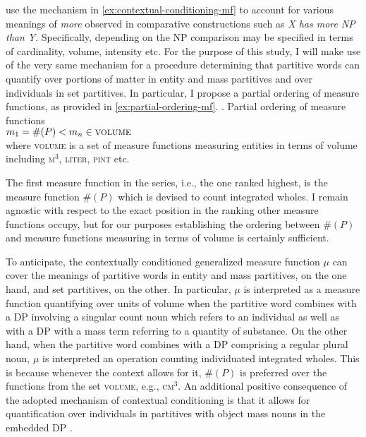 	\citeauthor{bale_barner2009interpretation} use the mechanism in \ref{ex:contextual-conditioning-mf} to account for various meanings of \textit{more} observed in comparative constructions such as \textit{X has more NP than Y}. Specifically, depending on the NP comparison may be specified in terms of cardinality, volume, intensity etc. For the purpose of this study, I will make use of the very same mechanism for a procedure determining that partitive words can quantify over portions of matter in entity and mass partitives and over individuals in set partitives. In particular, I propose a partial ordering of measure functions, as provided in \ref{ex:partial-ordering-mf}. 
	\ex. Partial ordering of measure functions\\
	$m_1 = \#(P) < m_n \in \textsc{volume}$\\
	where \textsc{volume} is a set of measure functions measuring entities in terms of volume including \textsc{m$^3$}, \textsc{liter}, \textsc{pint} etc.\label{ex:partial-ordering-mf} 
	
	The first measure function in the series, i.e., the one ranked highest, is the measure function $\#(P)$ which is devised to count integrated wholes. I remain agnostic with respect to the exact position in the ranking other measure functions occupy, but for our purposes establishing the ordering between $\#(P)$ and measure functions measuring in terms of volume is certainly sufficient.
	
	To anticipate, the contextually conditioned generalized measure function $\mu$ can cover the meanings of partitive words in entity and mass partitives, on the one hand, and set partitives, on the other. In particular, $\mu$ is interpreted as a measure function quantifying over units of volume when the partitive word combines with a DP involving a singular count noun which refers to an individual as well as with a DP with a mass term referring to a quantity of substance. On the other hand, when the partitive word combines with a DP comprising a regular plural noun, $\mu$ is interpreted an operation counting individuated integrated wholes. This is because whenever the context allows for it, $\#(P)$ is preferred over the functions from the set \textsc{volume}, e.g., \textsc{cm$^3$}. An additional positive consequence of the adopted mechanism of contextual conditioning is that it allows for quantification over individuals in partitives with object mass nouns in the embedded DP \citep[see][]{barner_snedeker2005quantity,bale_barner2009interpretation}.
	
